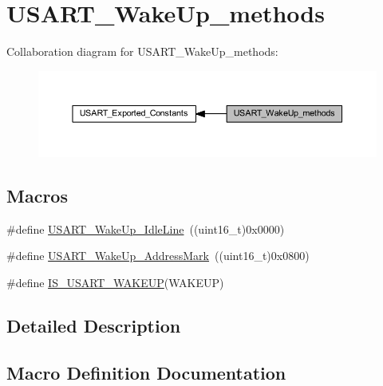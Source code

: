\hypertarget{group___u_s_a_r_t___wake_up__methods}{}\section{U\+S\+A\+R\+T\+\_\+\+Wake\+Up\+\_\+methods}
\label{group___u_s_a_r_t___wake_up__methods}
Collaboration diagram for U\+S\+A\+R\+T\+\_\+\+Wake\+Up\+\_\+methods\+:
\nopagebreak
\begin{figure}[H]
\begin{center}
\leavevmode
\includegraphics[width=350pt]{group___u_s_a_r_t___wake_up__methods}
\end{center}
\end{figure}
\subsection*{Macros}
\begin{DoxyCompactItemize}
\item 
\#define \hyperlink{group___u_s_a_r_t___wake_up__methods_ga9646d71590d5cef29ee12da0bb431d92}{U\+S\+A\+R\+T\+\_\+\+Wake\+Up\+\_\+\+Idle\+Line}~((uint16\+\_\+t)0x0000)
\item 
\#define \hyperlink{group___u_s_a_r_t___wake_up__methods_ga9f63c1671060682adee91b9a2f3202e4}{U\+S\+A\+R\+T\+\_\+\+Wake\+Up\+\_\+\+Address\+Mark}~((uint16\+\_\+t)0x0800)
\item 
\#define \hyperlink{group___u_s_a_r_t___wake_up__methods_ga3611be417bdb82f42dc2ca17584271f9}{I\+S\+\_\+\+U\+S\+A\+R\+T\+\_\+\+W\+A\+K\+E\+UP}(W\+A\+K\+E\+UP)
\end{DoxyCompactItemize}


\subsection{Detailed Description}


\subsection{Macro Definition Documentation}
\mbox{\label{group___u_s_a_r_t___wake_up__methods_ga3611be417bdb82f42dc2ca17584271f9}} 
